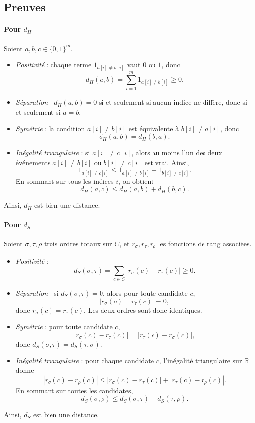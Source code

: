 \documentclass[11pt,a4paper]{article}
\begin{document}
\subsection*{Preuves}

\paragraph{Pour \(d_H\)}
Soient \(a,b,c \in \{0,1\}^m\).
\begin{itemize}[leftmargin=*]
    \item \emph{Positivit\'e} : chaque terme \(1_{a[i]\ne b[i]}\) vaut \(0\) ou \(1\), donc
    \[
    d_H(a,b)=\sum_{i=1}^m 1_{a[i]\ne b[i]} \ge 0.
    \]
    \item \emph{S\'eparation} : \(d_H(a,b)=0\) si et seulement si aucun indice ne diff\`ere, donc si et seulement si \(a=b\).
    \item \emph{Sym\'etrie} : la condition \(a[i]\ne b[i]\) est \'equivalente \`a \(b[i]\ne a[i]\), donc
    \[
    d_H(a,b)=d_H(b,a).
    \]
    \item \emph{In\'egalit\'e triangulaire} : si \(a[i]\ne c[i]\), alors au moins l'un des deux \'ev\'enements \(a[i]\ne b[i]\) ou \(b[i]\ne c[i]\) est vrai. Ainsi,
    \[
    1_{a[i]\ne c[i]} \le 1_{a[i]\ne b[i]} + 1_{b[i]\ne c[i]}.
    \]
    En sommant sur tous les indices \(i\), on obtient
    \[
    d_H(a,c)\le d_H(a,b)+d_H(b,c).
    \]
\end{itemize}
Ainsi, \(d_H\) est bien une distance.

\paragraph{Pour \(d_S\)}
Soient \(\sigma,\tau,\rho\) trois ordres totaux sur \(C\), et \(r_\sigma, r_\tau, r_\rho\) les fonctions de rang associ\'ees.
\begin{itemize}[leftmargin=*]
    \item \emph{Positivit\'e} :
    \[
    d_S(\sigma,\tau)=\sum_{c\in C}|r_\sigma(c)-r_\tau(c)| \ge 0.
    \]
    \item \emph{S\'eparation} : si \(d_S(\sigma,\tau)=0\), alors pour toute candidate \(c\),
    \[
    |r_\sigma(c)-r_\tau(c)|=0,
    \]
    donc \(r_\sigma(c)=r_\tau(c)\). Les deux ordres sont donc identiques.
    \item \emph{Sym\'etrie} : pour toute candidate \(c\),
    \[
    |r_\sigma(c)-r_\tau(c)| = |r_\tau(c)-r_\sigma(c)|,
    \]
    donc \(d_S(\sigma,\tau)=d_S(\tau,\sigma)\).
    \item \emph{In\'egalit\'e triangulaire} : pour chaque candidate \(c\), l'in\'egalit\'e triangulaire sur \(\mathbb{R}\) donne
    \[
    |r_\sigma(c)-r_\rho(c)| \le |r_\sigma(c)-r_\tau(c)| + |r_\tau(c)-r_\rho(c)|.
    \]
    En sommant sur toutes les candidates,
    \[
    d_S(\sigma,\rho)\le d_S(\sigma,\tau)+d_S(\tau,\rho).
    \]
\end{itemize}
Ainsi, \(d_S\) est bien une distance.
\end{document}
